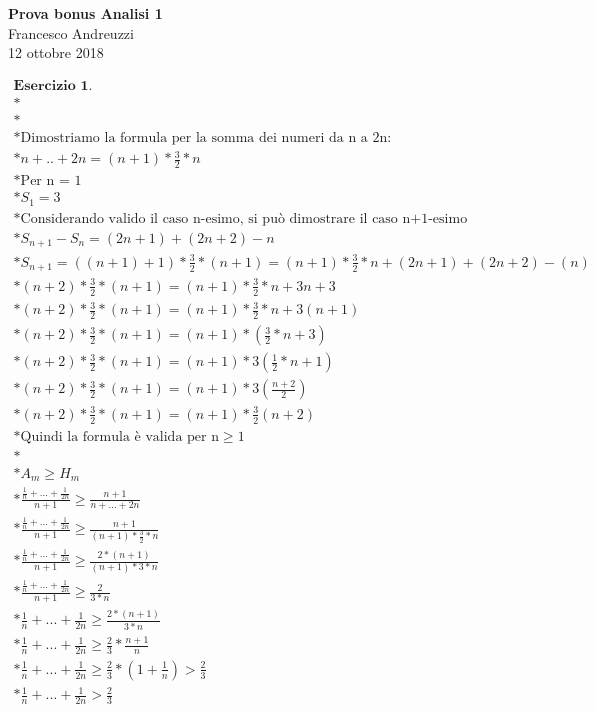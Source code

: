 \documentclass{article}
\begin{document}
\begin{titlepage}
   \begin{center}
      \Large\textbf{Prova bonus Analisi 1}\\
      \large{Francesco Andreuzzi}\\
      \large{12 ottobre 2018}
   \end{center}
\end{titlepage}

\begin{gather*}
\textbf{Esercizio 1.}\\*\\*\\*
\text{Dimostriamo la formula per la somma dei numeri da n a 2n:}\\*
n + .. + 2n = (n+1)*\frac{3}{2}*n\\*
\text{Per n = 1}\\*
S_1 = 3\\*
\text{Considerando valido il caso n-esimo, si può dimostrare il caso n+1-esimo}\\*
S_{n+1} - S_n = (2n+1) + (2n+2) - n\\*
S_{n+1} = ((n + 1) + 1)*\frac{3}{2}*(n+1) = (n+1)*\frac{3}{2}*n + (2n+1) + (2n+2) - (n)\\*
(n+2)*\frac{3}{2}*(n+1) = (n+1)*\frac{3}{2}*n + 3n+3\\*
(n+2)*\frac{3}{2}*(n+1) = (n+1)*\frac{3}{2}*n + 3(n+1)\\*
(n+2)*\frac{3}{2}*(n+1) = (n+1)*(\frac{3}{2}*n + 3)\\*
(n+2)*\frac{3}{2}*(n+1) = (n+1)*3(\frac{1}{2}*n + 1)\\*
(n+2)*\frac{3}{2}*(n+1) = (n+1)*3(\frac{n+2}{2})\\*
(n+2)*\frac{3}{2}*(n+1) = (n+1)*\frac{3}{2}(n+2)\\*
\text{Quindi la formula è valida per n} \geq 1\\*\\*
A_m \geq H_m\\*
\frac{\frac{1}{n} + ... + \frac{1}{2n}}{n+1} \geq \frac{n+1}{n + ... + 2n}\\*
\frac{\frac{1}{n} + ... + \frac{1}{2n}}{n+1} \geq \frac{n+1}{(n+1)*\frac{3}{2}*n}\\*
\frac{\frac{1}{n} + ... + \frac{1}{2n}}{n+1} \geq \frac{2*(n+1)}{(n+1)*3*n}\\*
\frac{\frac{1}{n} + ... + \frac{1}{2n}}{n+1} \geq \frac{2}{3*n}\\*
\frac{1}{n} + ... + \frac{1}{2n} \geq \frac{2*(n+1)}{3*n}\\*
\frac{1}{n} + ... + \frac{1}{2n} \geq \frac{2}{3} * \frac{n+1}{n}\\*
\frac{1}{n} + ... + \frac{1}{2n} \geq \frac{2}{3} * (1 + \frac{1}{n}) >  \frac{2}{3}\\*
\frac{1}{n} + ... + \frac{1}{2n} >  \frac{2}{3}
\end{gather*}
\end{document}
